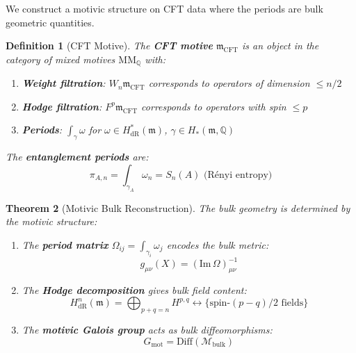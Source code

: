\documentclass[12pt,a4paper]{article}
\newtheorem{theorem}{Theorem}[section]
\newtheorem{definition}[theorem]{Definition}
\begin{document}
We construct a motivic structure on CFT data where the periods are bulk geometric quantities.

\begin{definition}[CFT Motive]\label{def:cft-motive}
The \textbf{CFT motive} $\mathfrak{m}_{\text{CFT}}$ is an object in the category of mixed motives $\text{MM}_{\mathbb{Q}}$ with:
\begin{enumerate}
    \item \textbf{Weight filtration}: $W_n \mathfrak{m}_{\text{CFT}}$ corresponds to operators of dimension $\leq n/2$
    \item \textbf{Hodge filtration}: $F^p \mathfrak{m}_{\text{CFT}}$ corresponds to operators with spin $\leq p$
    \item \textbf{Periods}: $\int_\gamma \omega$ for $\omega \in H^*_{\text{dR}}(\mathfrak{m})$, $\gamma \in H_*(\mathfrak{m}, \mathbb{Q})$
\end{enumerate}

The \textbf{entanglement periods} are:
\begin{equation}
\pi_{A,n} = \int_{\gamma_A} \omega_n = S_n(A) \text{ (R\'enyi entropy)}
\end{equation}
\end{definition}

\begin{theorem}[Motivic Bulk Reconstruction]\label{thm:motivic-bulk-recon}
The bulk geometry is determined by the motivic structure:
\begin{enumerate}
    \item The \textbf{period matrix} $\Omega_{ij} = \int_{\gamma_i} \omega_j$ encodes the bulk metric:
    \begin{equation}
    g_{\mu\nu}(X) = (\text{Im}\, \Omega)^{-1}_{\mu\nu}
    \end{equation}
    
    \item The \textbf{Hodge decomposition} gives bulk field content:
    \begin{equation}
    H^n_{\text{dR}}(\mathfrak{m}) = \bigoplus_{p+q=n} H^{p,q} \leftrightarrow \{\text{spin-}(p-q)/2 \text{ fields}\}
    \end{equation}
    
    \item The \textbf{motivic Galois group} acts as bulk diffeomorphisms:
    \begin{equation}
    G_{\text{mot}} = \text{Diff}(\mathcal{M}_{\text{bulk}})
    \end{equation}
\end{enumerate}
\end{theorem}
\end{document}
